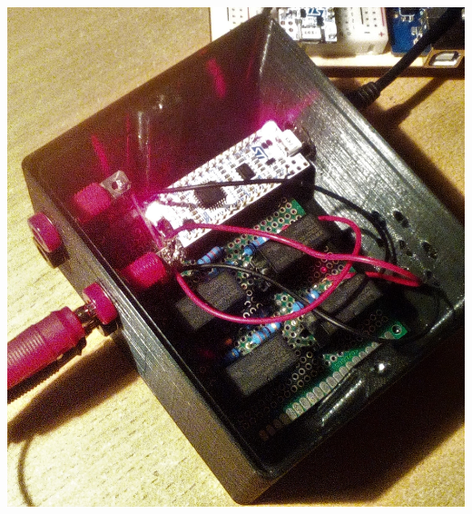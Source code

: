 \documentclass[main.tex]{subfiles}
\begin{document}
\begin{multicols*}{2}
			\begin{figurehere}
				\centering
				\includegraphics[width=\linewidth]{../Obrazky/krabicaFotka2-crop}
				\caption{Krabica - záber 2}
				\label{fig:krabicaFotka1}
			\end{figurehere}
		\end{multicols*}
\end{document}
